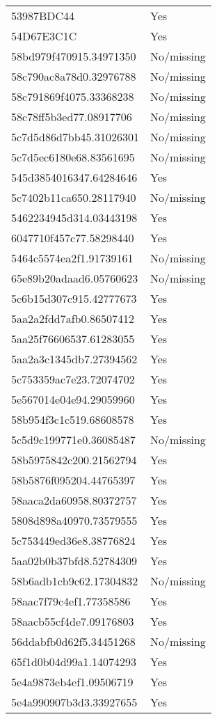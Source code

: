 \begin{tabular}{ll}
53987BDC44 & Yes \\
54D67E3C1C & Yes \\
58bd979f470915.34971350 & No/missing \\
58c790ac8a78d0.32976788 & No/missing \\
58c791869f4075.33368238 & No/missing \\
58c78ff5b3ed77.08917706 & No/missing \\
5c7d5d86d7bb45.31026301 & No/missing \\
5c7d5ec6180e68.83561695 & No/missing \\
545d3854016347.64284646 & Yes \\
5c7402b11ca650.28117940 & No/missing \\
5462234945d314.03443198 & Yes \\
6047710f457c77.58298440 & Yes \\
5464c5574ea2f1.91739161 & No/missing \\
65e89b20adaad6.05760623 & No/missing \\
5c6b15d307c915.42777673 & Yes \\
5aa2a2fdd7afb0.86507412 & Yes \\
5aa25f76606537.61283055 & Yes \\
5aa2a3c1345db7.27394562 & Yes \\
5c753359ac7e23.72074702 & Yes \\
5e567014e04e94.29059960 & Yes \\
58b954f3c1c519.68608578 & Yes \\
5c5d9c199771e0.36085487 & No/missing \\
58b5975842c200.21562794 & Yes \\
58b5876f095204.44765397 & Yes \\
58aaca2da60958.80372757 & Yes \\
5808d898a40970.73579555 & Yes \\
5c753449ed36e8.38776824 & Yes \\
5aa02b0b37bfd8.52784309 & Yes \\
58b6adb1cb9c62.17304832 & No/missing \\
58aac7f79c4ef1.77358586 & Yes \\
58aacb55cf4de7.09176803 & Yes \\
56ddabfb0d62f5.34451268 & No/missing \\
65f1d0b04d99a1.14074293 & Yes \\
5e4a9873eb4ef1.09506719 & Yes \\
5e4a990907b3d3.33927655 & Yes \\

\end{tabular}
